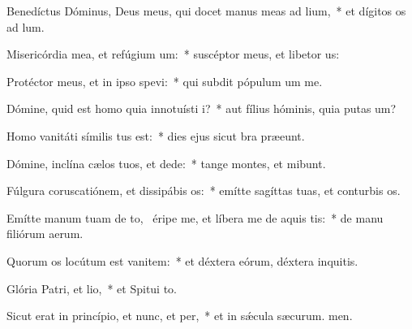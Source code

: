 \item Benedíctus Dóminus, Deus meus, qui docet manus meas ad lium,~* et dígitos os ad lum.
\item Misericórdia mea, et refúgium um:~* suscéptor meus, et libetor us:
\item Protéctor meus, et in ipso spevi:~* qui subdit pópulum um  me.
\item Dómine, quid est homo quia innotuísti i?~* aut fílius hóminis, quia putas um?
\item Homo vanitáti símilis tus est:~* dies ejus sicut bra præeunt.
\item Dómine, inclína cælos tuos, et dede:~* tange montes, et mibunt.
\item Fúlgura coruscatiónem, et dissipábis os:~* emítte sagíttas tuas, et conturbis os.
\item Emítte manum tuam de to,~\pscross{} éripe me, et líbera me de aquis tis:~* de manu filiórum aerum.
\item Quorum os locútum est vanitem:~* et déxtera eórum, déxtera inquitis.
\item Glória Patri, et lio,~* et Spitui to.
\item Sicut erat in princípio, et nunc, et per,~* et in sǽcula sæcurum. men.
